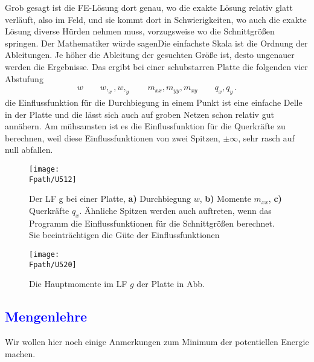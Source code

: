 {{Grob gesagt ist die FE-L\"{o}sung dort genau, wo die exakte L\"{o}sung relativ glatt verl\"{a}uft, also im Feld, und sie kommt dort in Schwierigkeiten, wo auch die exakte L\"{o}sung diverse H\"{u}rden nehmen muss, vorzugsweise wo die Schnittgr\"{o}{\ss}en springen. Der Mathematiker w\"{u}rde sagenDie einfachste Skala ist die Ordnung der Ableitungen.
Je h\"{o}her die Ableitung der gesuchten Gr\"{o}{\ss}e ist, desto ungenauer werden die Ergebnisse. Das ergibt bei einer
schubstarren Platte die folgenden vier Abstufung
\begin{align}
w \qquad w,_x, w,_y \qquad m_{xx}, m_{yy}, m_{xy} \qquad q_x, q_y\,.
\end{align}
die Einflussfunktion f\"{u}r die Durchbiegung in einem Punkt ist eine einfache Delle in der Platte und die
l\"{a}sst sich auch auf groben Netzen schon relativ gut ann\"{a}hern. Am m\"{u}hsamsten ist es die Einflussfunktion f\"{u}r die
Querkr\"{a}fte zu berechnen, weil diese Einflussfunktionen von zwei Spitzen, $\pm \infty $, sehr
rasch auf null abfallen.


\begin{figure}[tbp]
\centering
\texttt{[image: \\Fpath/U512]}
\caption{Der LF g bei einer Platte, \textbf{ a)} Durchbiegung $w$, \textbf{ b)} Momente $m_{xx}$, \textbf{ c)} Querkr\"{a}fte $q_x$. \"{A}hnliche Spitzen werden auch auftreten, wenn das Programm die Einflussfunktionen f\"{u}r die Schnittgr\"{o}{\ss}en berechnet. Sie beeintr\"{a}chtigen die G\"{u}te der Einflussfunktionen}
\label{U512}%
\end{figure}%
\begin{figure}[tbp]
\centering
\if {} \sidecaption \fi
\texttt{[image: \\Fpath/U520]}
\caption{Die Hauptmomente im LF $g$ der Platte in Abb. } \label{U520}
\end{figure}%

{\textcolor{blue}{\section{Mengenlehre}}}\label{Mengenlehre}
Wir wollen hier
noch einige Anmerkungen zum Minimum der potentiellen Energie  machen.

}}
